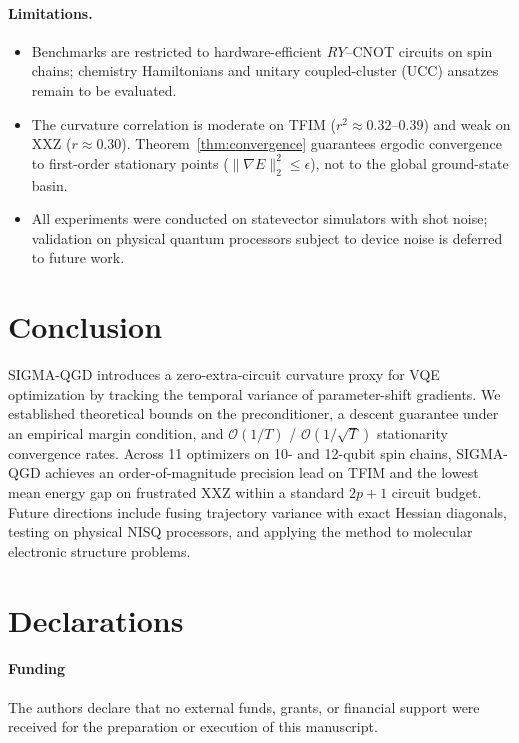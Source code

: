 \documentclass[11pt,a4paper]{article}
\begin{document}
\paragraph{Limitations.}
\begin{itemize}
    \item Benchmarks are restricted to hardware-efficient $RY$--CNOT circuits on spin chains; chemistry Hamiltonians and unitary coupled-cluster (UCC) ansatzes remain to be evaluated.
    \item The curvature correlation is moderate on TFIM ($r^2 \approx 0.32$--$0.39$) and weak on XXZ ($r \approx 0.30$). Theorem~\ref{thm:convergence} guarantees ergodic convergence to first-order stationary points ($\|\nabla E\|_2^2 \le \epsilon$), not to the global ground-state basin.
    \item All experiments were conducted on statevector simulators with shot noise; validation on physical quantum processors subject to device noise is deferred to future work.
\end{itemize}

\section{Conclusion}
\label{sec:conclusion}
SIGMA-QGD introduces a zero-extra-circuit curvature proxy for VQE optimization by tracking the temporal variance of parameter-shift gradients. We established theoretical bounds on the preconditioner, a descent guarantee under an empirical margin condition, and $\mathcal{O}(1/T)$ / $\mathcal{O}(1/\sqrt{T})$ stationarity convergence rates. Across 11 optimizers on 10- and 12-qubit spin chains, SIGMA-QGD achieves an order-of-magnitude precision lead on TFIM and the lowest mean energy gap on frustrated XXZ within a standard $2p+1$ circuit budget. Future directions include fusing trajectory variance with exact Hessian diagonals, testing on physical NISQ processors, and applying the method to molecular electronic structure problems.

\section*{Declarations}

\paragraph{Funding}
The authors declare that no external funds, grants, or financial support were received for the preparation or execution of this manuscript.
\end{document}

